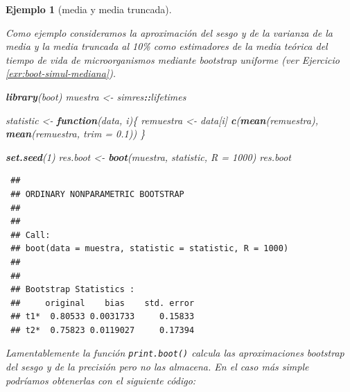 \documentclass[
  spanish,
  10pt,
]{book}
\newenvironment{Shaded}{\begin{snugshade}}{\end{snugshade}}
\newcommand{\AttributeTok}[1]{\textcolor[rgb]{0.13,0.29,0.53}{#1}}
\newcommand{\ControlFlowTok}[1]{\textcolor[rgb]{0.13,0.29,0.53}{\textbf{#1}}}
\newcommand{\DecValTok}[1]{\textcolor[rgb]{0.00,0.00,0.81}{#1}}
\newcommand{\FloatTok}[1]{\textcolor[rgb]{0.00,0.00,0.81}{#1}}
\newcommand{\FunctionTok}[1]{\textcolor[rgb]{0.13,0.29,0.53}{\textbf{#1}}}
\newcommand{\NormalTok}[1]{#1}
\newcommand{\OtherTok}[1]{\textcolor[rgb]{0.56,0.35,0.01}{#1}}
\newcommand{\SpecialCharTok}[1]{\textcolor[rgb]{0.81,0.36,0.00}{\textbf{#1}}}
\theoremstyle{break}
\newtheorem{example}{Ejemplo}[chapter]
\theoremstyle{nonumberplain}
\begin{document}
\begin{example}[media y media truncada]
\protect\hypertarget{exm:boot-simul-sesgo-var}{}\label{exm:boot-simul-sesgo-var}

Como ejemplo consideramos la aproximación del sesgo y de la varianza de la media y la media truncada al 10\% como estimadores de la media teórica del tiempo de vida de microorganismos mediante bootstrap uniforme (ver Ejercicio \ref{exr:boot-simul-mediana}).

\begin{Shaded}
\begin{Highlighting}[]
\FunctionTok{library}\NormalTok{(boot)}
\NormalTok{muestra }\OtherTok{\textless{}{-}}\NormalTok{ simres}\SpecialCharTok{::}\NormalTok{lifetimes}

\NormalTok{statistic }\OtherTok{\textless{}{-}} \ControlFlowTok{function}\NormalTok{(data, i)\{}
\NormalTok{  remuestra }\OtherTok{\textless{}{-}}\NormalTok{ data[i]}
  \FunctionTok{c}\NormalTok{(}\FunctionTok{mean}\NormalTok{(remuestra), }\FunctionTok{mean}\NormalTok{(remuestra, }\AttributeTok{trim =} \FloatTok{0.1}\NormalTok{))}
\NormalTok{\}}

\FunctionTok{set.seed}\NormalTok{(}\DecValTok{1}\NormalTok{)}
\NormalTok{res.boot }\OtherTok{\textless{}{-}} \FunctionTok{boot}\NormalTok{(muestra, statistic, }\AttributeTok{R =} \DecValTok{1000}\NormalTok{)}
\NormalTok{res.boot}
\end{Highlighting}
\end{Shaded}

\begin{verbatim}
 ## 
 ## ORDINARY NONPARAMETRIC BOOTSTRAP
 ## 
 ## 
 ## Call:
 ## boot(data = muestra, statistic = statistic, R = 1000)
 ## 
 ## 
 ## Bootstrap Statistics :
 ##     original    bias    std. error
 ## t1*  0.80533 0.0031733     0.15833
 ## t2*  0.75823 0.0119027     0.17394
\end{verbatim}

Lamentablemente la función \texttt{print.boot()} calcula las aproximaciones bootstrap del sesgo y de la precisión pero no las almacena.
En el caso más simple podríamos obtenerlas con el siguiente código:


\end{example}
\end{document}
